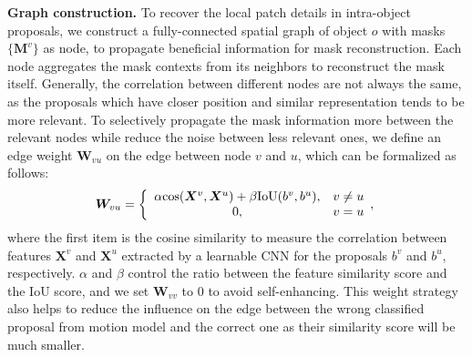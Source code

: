 \documentclass[letterpaper]{article} \usepackage{aaai21}  \usepackage{times}  \usepackage{helvet} \usepackage{courier}  \usepackage[hyphens]{url}  \usepackage{graphicx} \urlstyle{rm} \def\UrlFont{\rm}  \usepackage{graphicx}  \usepackage{natbib}  \usepackage{caption} \frenchspacing  \setlength{\pdfpagewidth}{8.5in}  \setlength{\pdfpageheight}{11in}  \usepackage{amsmath}
\begin{document}
\noindent \textbf{Graph construction.}
To recover the local patch details in intra-object proposals, we construct a fully-connected spatial graph of object $o$ with masks $\{\bm{M}^{v}\}$ as node, to propagate beneficial information for mask reconstruction. Each node aggregates the mask contexts from its neighbors to reconstruct the mask itself. Generally, the correlation between different nodes are not always the same, as the proposals which have closer position and similar representation tends to be more relevant. 
To selectively propagate the mask information more between the relevant nodes while reduce the noise between less relevant ones, we define an edge weight $\bm{W}_{vu}$ on the edge between node $v$ and $u$, which can be formalized as follows:
\begin{equation}
    \bm{W}_{vu} = \left\{  
             \begin{array}{cl}
              \alpha {\rm cos}(\bm{X}^v, \bm{X}^u)+\beta  \text{IoU}(b^{v}, b^{u}),  & v \neq u  \\  
              0,  & v = u  \\
             \end{array},
\right. 
\label{eq:alpha}
\end{equation}
where the first item is the cosine similarity to measure the correlation between features $\bm{X}^v$ and $\bm{X}^u$ extracted by a learnable CNN for the proposals $b^v$ and $b^u$, respectively. $\alpha$ and $\beta$ control the ratio between the feature similarity score and the IoU score, and we set $\bm{W}_{vv}$ to 0 to avoid self-enhancing. This weight strategy also helps to reduce the influence on the edge between the wrong classified proposal from motion model and the correct one as their similarity score will be much smaller.
\end{document}
